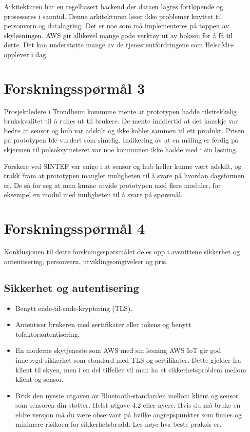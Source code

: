 Arkitekturen har en regelbasert backend der dataen lagres fortløpende og
prosesseres i sanntid. Denne arkitekturen løser ikke problemer knyttet til personvern
og datalagring. Det er noe som må implementeres på toppen av skyløsningen. AWS gir allikevel
mange gode verktøy ut av boksen for å få til dette. Det kan understøtte mange av de
tjenesteutfordringene som HelsaMi+ opplever i dag.

\section{Forskningsspørmål 3}
\textbf{}

Prosjektledere i Trondheim kommune mente at prototypen hadde tilstrekkelig
brukskvalitet til å rulles ut til brukere. De mente imidlertid at det kanskje var bedre at
sensor og hub var adskilt og ikke koblet sammen til ett produkt. Prisen på prototypen
ble vurdert som rimelig. Indikering av at en måling er ferdig på skjermen til pulsoksymeteret
var noe kommunen ikke hadde med i sin løsning.

Forskere ved SINTEF var enige i at sensor og hub heller kunne vært adskilt, og trakk
fram at prototypen manglet muligheten til å svare på hvordan
dagsformen er. De så for seg at man kunne utvide prototypen med flere moduler,
for eksempel en modul med muligheten til å svare på spørsmål.

\section{Forskningsspørmål 4}
\textbf{}

Konklusjonen til dette forskningsspørsmålet deles opp
i avsnittene sikkerhet og autentisering, personvern, utviklingsomgivelser og
pris.

\subsection{Sikkerhet og autentisering}
\begin{itemize}
  \item Benytt ende-til-ende-kryptering (TLS).
  \item Autentiser brukeren med sertifikater eller tokens og benytt tofaktorautentisering.
  \item En moderne skytjeneste som AWS med sin løsning AWS IoT gir
      god innebygd sikkerhet som standard med TLS og sertifikater. Dette gjelder fra klient til skyen,
      men i en del tilfeller vil man ha et sikkerhetsproblem mellom klient og sensor.
  \item Bruk den nyeste utgaven av Bluetooth-standarden mellom klient og sensor som sensoren din
  støtter. Helst utgave 4.2 eller nyere. Hvis du må bruke en eldre versjon må
  du være observant på hvilke angrepspunkter som finnes og minimere risikoen for
  sikkerhetsbrudd. Les nøye hva beste praksis er.
\end{itemize}

